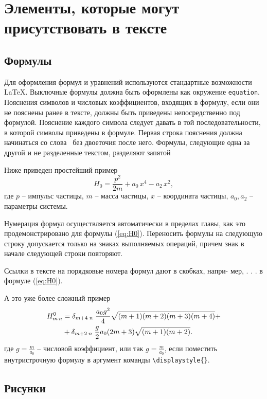 \chapter{Элементы, которые могут присутствовать в тексте}

\section{Формулы}

Для оформления формул и уравнений используются стандартные возможности \LaTeX.
Выключные формулы должна быть оформлены как окружение \verb|equation|. Пояснения символов и числовых коэффициентов, 
входящих в формулу, если они не пояснены ранее в тексте,
должны быть приведены непосредственно под формулой. Пояснение каждого
символа следует давать в той последовательности, в которой
символы приведены в формуле. Первая строка пояснения должна начинаться
со слова  \guillemotright\ без двоеточия после него.
Формулы, следующие одна за другой и не разделенные текстом, разделяют запятой

Ниже приведен простейший пример
\begin{equation}\label{eq:H0}
H_0 = \frac{p^2}{2 m} + a_0\, x^4 - a_2\, x^2,
\end{equation}
где  $p$ -- импульс частицы, $m$ -- масса частицы, $x$ -- координата частицы, $a_0, a_2$ -- параметры системы.

Нумерация формул осуществляется автоматически в пределах главы, как это
продемонстрировано для формулы (\ref{eq:H0}).
Переносить формулы на следующую строку допускается только на знаках выполняемых операций,
причем знак в начале следующей строки повторяют. 

Ссылки в тексте на порядковые номера формул дают в скобках, напри-
мер, . . . в формуле (\ref{eq:H0}).

А это уже более сложный пример
\begin{align}
H^0_{m\, n} & = \delta_{m + 4 \; n} \;\frac{a_0 g^2}{4} \sqrt{(m + 1)(m + 2)(m +
3)(m +
4)} +\notag\\
 & + \delta_{m + 2 \; n} \;\frac{g}{2} a_0  (2 m + 3) \sqrt{(m
+ 1)(m  + 2)}.\label{eq:Hmn}
\end{align}
где $g = \frac{m}{a_0}$ -- числовой коэффициент, или так $\displaystyle{g = \frac{m}{a_0}}$, если поместить внутристрочную формулу в аргумент команды \verb|\displaystyle{}|.



\section{Рисунки}

